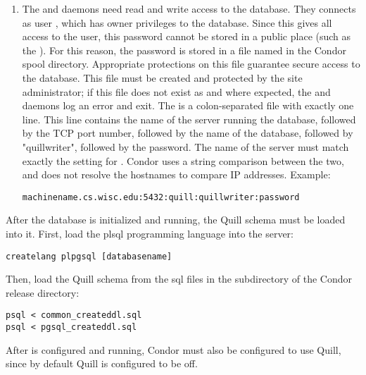 \begin{enumerate}
\item The  and  daemons need read and write access
to the database.
They connects as user ,
which has owner privileges to the database.
Since this gives all access to the  user,
this password cannot be stored in a public place 
(such as the ).
For this reason, the  password is stored
in a file named  in the Condor spool directory.
Appropriate protections on this file guarantee secure access to the database.
This file must be created and protected by the site administrator;
if this file does not exist as and where expected, the 
and  daemons log an error and exit.
The  is a colon-separated file
with exactly one line. 
This line contains the name of the server running
the database, followed by the TCP port number, followed by the
name of the database, followed by "quillwriter", followed by the password.
The name of the server must match exactly the setting for 
.
Condor uses a string comparison between the two, and does not resolve the
hostnames to compare IP addresses.
Example:
\begin{verbatim}
machinename.cs.wisc.edu:5432:quill:quillwriter:password
\end{verbatim}

\end{enumerate}

After the  database is initialized and running, 
the Quill schema
must be loaded into it.  First, load the plsql programming language
into the server:

\begin{verbatim}
createlang plpgsql [databasename]
\end{verbatim}

Then, load the Quill schema from the sql files in the  subdirectory
of the Condor release directory:

\begin{verbatim}
psql < common_createddl.sql
psql < pgsql_createddl.sql
\end{verbatim}


After  is configured and running, Condor must also be
configured to use Quill, since by default Quill is configured to be off.

